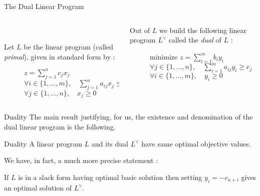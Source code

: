 \documentclass[32pt, aspectratio = 169]{beamer}
\begin{document}
\begin{frame}{The Dual Linear Program}
    \begin{columns}[T]
        \begin{column}{.5\textwidth}
            ~\vspace{.15\baselineskip}

            Let $L$ be the linear program (called \emph{primal}), given in standard form by :
            \begin{figure}
            \begin{linearProgG}{
                ${\displaystyle z = \sum_{j = 1 }^n c_jx_j}$
                }{
                ${\displaystyle \forall i \in \{1, \ldots, m\} , \quad \sum_{j = 1}^n a_{ij}x_j \leq b_i}$
                }{
                $\forall j \in \{1, \ldots, n\}, \quad x_j \geq 0$
                }
            \end{linearProgG}
            \end{figure}
        \end{column}
        \begin{column}{.55\textwidth}
            \begin{tcolorbox}[
                enhanced,
                parbox = false,
                colback = mLightBrown!30!white,
                colframe = mLightBrown!30!white,
                arc = 0mm,
                ]
                Out of $L$ we build the following linear program $L^\vee$ called the \emph{dual} of $L$ :
                \begin{figure}
                   \begin{linearProg}{
                        minimize
                        }{
                        ${\displaystyle z = \sum_{i=1}^m b_iy_i }$
                        }{
                        ${\displaystyle \forall j \in \{1, \ldots, n\}, \quad \sum_{i =1 }^m a_{ij}y_i \geq c_j}$
                        }{
                        $\forall i \in \{1, \ldots, m\}, \quad y_i \geq 0$
                        }
                    \end{linearProg}
                \end{figure}
            \end{tcolorbox}
        \end{column}
    \end{columns}
\end{frame}

\begin{frame}{Duality}
    The main result justifying, for us, the existence and denomination of the dual linear program is the following.
    \begin{alertblock}{Duality}
        A linear program $L$ and its dual $L^\vee$ have same optimal objective values.
    \end{alertblock}
    We have, in fact, a much more precise statement :
    \begin{prop}
        If $L$ is in a slack form having optimal basic solution then setting $y_i = -c_{n+i}$ gives an optimal solution of $L^\vee$.
    \end{prop}
\end{frame}
\end{document}
